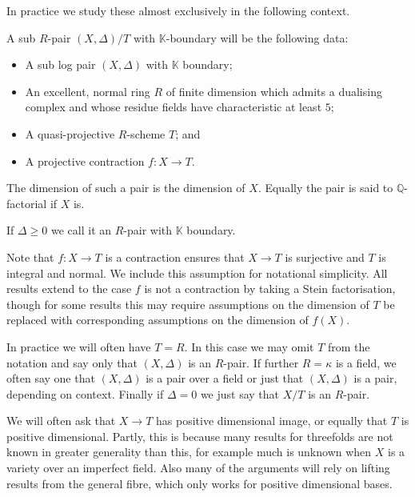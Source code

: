 In practice we study these almost exclusively in the following context.

\begin{definition}\label{setup}
	A sub $R$-pair $(X,\Delta)/ T$ with $\mathbb{K}$-boundary will be the following data:
	\begin{itemize}
		\item A sub log pair $(X,\Delta)$ with $\mathbb{K}$ boundary;
		\item An excellent, normal ring $R$ of finite dimension which admits a dualising complex and whose residue fields have characteristic at least $5$;
		\item A quasi-projective $R$-scheme $T$; and
		\item A projective contraction $f \colon X \to T$.
	\end{itemize}
	
	The dimension of such a pair is the dimension of $X$. Equally the pair is said to $\mathbb{Q}$-factorial if $X$ is.
	
	If $\Delta\geq 0$ we call it an $R$-pair with $\mathbb{K}$ boundary.
\end{definition}

Note that $f \colon X \to T$ is a contraction ensures that $X \to T$ is surjective and $T$ is integral and normal. We include this assumption for notational simplicity. All results extend to the case $f$ is not a contraction by taking a Stein factorisation, though for some results this may require assumptions on the dimension of $T$ be replaced with corresponding assumptions on the dimension of $f(X)$. 


%	

In practice we will often have $T=R$. In this case we may omit $T$ from the notation and say only that $(X,\Delta)$ is an $R$-pair. If further $R=\kappa$ is a field, we often say one that $(X,\Delta)$ is a pair over a field or just that $(X,\Delta)$ is a pair, depending on context. Finally if $\Delta=0$ we just say that $X/T$ is an $R$-pair.

We will often ask that $X \to T$ has positive dimensional image, or equally that $T$ is positive dimensional. Partly, this is because many results for threefolds are not known in greater generality than this, for example much is unknown when $X$ is a variety over an imperfect field. Also many of the arguments will rely on lifting results from the general fibre, which only works for positive dimensional bases.

